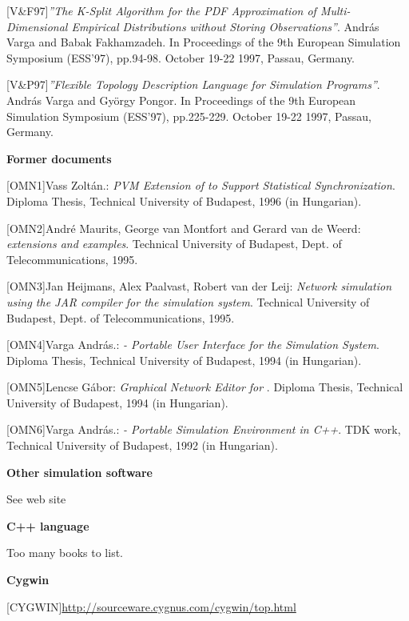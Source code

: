 [V\&F97]\tab \textit{''The K-Split Algorithm for the PDF Approximation
of Multi-Dimensional Empirical Distributions without Storing
Observations''}. Andr\'{a}s Varga and Babak Fakhamzadeh. In
Proceedings of the 9th European Simulation Symposium (ESS'97),
pp.94-98. October 19-22 1997, Passau, Germany.

[V\&P97]\tab \textit{''Flexible Topology Description Language for
Simulation Programs''}. Andr\'{a}s Varga and Gy\"{o}rgy Pongor.
In Proceedings of the 9th European Simulation Symposium (ESS'97),
pp.225-229. October 19-22 1997, Passau, Germany.


\textbf{Former {\opp} documents}


[OMN1]\tab Vass Zolt\'{a}n.: \textit{PVM Extension of {\opp} to Support
Statistical Synchronization}. Diploma Thesis, Technical University
of Budapest, 1996 (in Hungarian).

[OMN2]\tab Andr\'{e} Maurits, George van Montfort and Gerard van de
Weerd: \textit{{\opp} extensions and examples}. Technical University
of Budapest, Dept. of Telecommunications, 1995.

[OMN3]\tab Jan Heijmans, Alex Paalvast, Robert van der Leij: \textit{Network
simulation using the JAR compiler for the {\opp} simulation
system}. Technical University of Budapest, Dept. of Telecommunications,
1995.

[OMN4]\tab Varga Andr\'{a}s.: \textit{{\opp} - Portable User Interface
for the {\opp} Simulation System}. Diploma Thesis, Technical
University of Budapest, 1994 (in Hungarian).

[OMN5]\tab Lencse G\'{a}bor: \textit{Graphical Network Editor for {\opp}}.
Diploma Thesis, Technical University of Budapest, 1994 (in Hungarian).

[OMN6]\tab Varga Andr\'{a}s.: \textit{{\opp} - Portable Simulation Environment
in C++}. TDK work, Technical University of Budapest, 1992 (in Hungarian).


\textbf{Other simulation software}


See web site


\textbf{C++ language}


Too many books to list.


\textbf{Cygwin}


[CYGWIN]\tab \href{http://sourceware.cygnus.com/cygwin/top.html}{http://sourceware.cygnus.com/cygwin/top.html}



